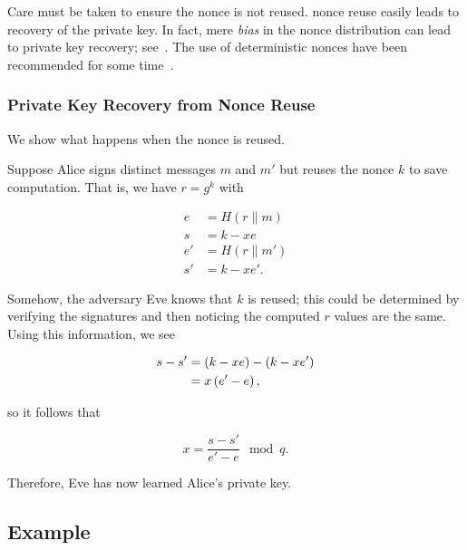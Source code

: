 Care must be taken to ensure the \gls{nonce} is not reused.
\Gls{nonce} reuse easily leads to recovery of the private key.
In fact, mere \emph{bias} in the \gls{nonce} distribution
can lead to private key recovery;
see~\cite{cryptoeprint:2019:023}.
The use of deterministic \glspl{nonce} have been recommended
for some time~\cite{rfc6979}.

\subsubsection{Private Key Recovery from Nonce Reuse}

We show what happens when the \gls{nonce} is reused.

Suppose Alice signs distinct messages $m$ and $m'$
but reuses the \gls{nonce} $k$ to save computation.
That is, we have $r = g^{k}$ with

\begin{align}
    e &= H(r\|m) \nonumber\\
    s &= k - xe \nonumber\\
    e' &= H(r\|m') \nonumber\\
    s' &= k - xe'.
\end{align}

\noindent
Somehow, the adversary Eve knows that $k$ is reused;
this could be determined by verifying the signatures
and then noticing the computed $r$ values are the same.
Using this information, we see

\begin{align}
    s - s' &= \left( k - xe \right) - \left( k - xe' \right) \nonumber\\
        &= x\left( e'-e \right),
\end{align}

\noindent
so it follows that

\begin{equation}
    x = \frac{s-s'}{e'-e} \mod q.
\end{equation}

\noindent
Therefore, Eve has now learned Alice's private key.

\subsection{Example}

